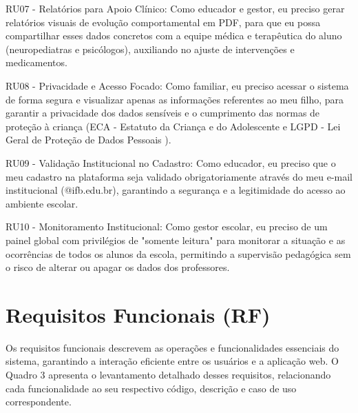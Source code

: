 RU07 - Relatórios para Apoio Clínico: Como educador e gestor, eu preciso gerar relatórios visuais de evolução comportamental em PDF, para que eu possa compartilhar esses dados concretos com a equipe médica e terapêutica do aluno (neuropediatras e psicólogos), auxiliando no ajuste de intervenções e medicamentos.

RU08 - Privacidade e Acesso Focado: Como familiar, eu preciso acessar o sistema de forma segura e visualizar apenas as informações referentes ao meu filho, para garantir a privacidade dos dados sensíveis e o cumprimento das normas de proteção à criança (ECA - Estatuto da Criança e do Adolescente \cite{lei8069_1990} e LGPD - Lei Geral de Proteção de Dados Pessoais \cite{lei13709_2018}).

RU09 - Validação Institucional no Cadastro: Como educador, eu preciso que o meu cadastro na plataforma seja validado obrigatoriamente através do meu e-mail institucional (@ifb.edu.br), garantindo a segurança e a legitimidade do acesso ao ambiente escolar.

RU10 - Monitoramento Institucional: Como gestor escolar, eu preciso de um painel global com privilégios de "somente leitura" para monitorar a situação e as ocorrências de todos os alunos da escola, permitindo a supervisão pedagógica sem o risco de alterar ou apagar os dados dos professores.


\vspace{0.5cm}
\section{Requisitos Funcionais (RF)}

Os requisitos funcionais descrevem as operações e funcionalidades essenciais do sistema, garantindo a interação eficiente entre os usuários e a aplicação web. O Quadro 3 apresenta o levantamento detalhado desses requisitos, relacionando cada funcionalidade ao seu respectivo código, descrição e caso de uso correspondente.

